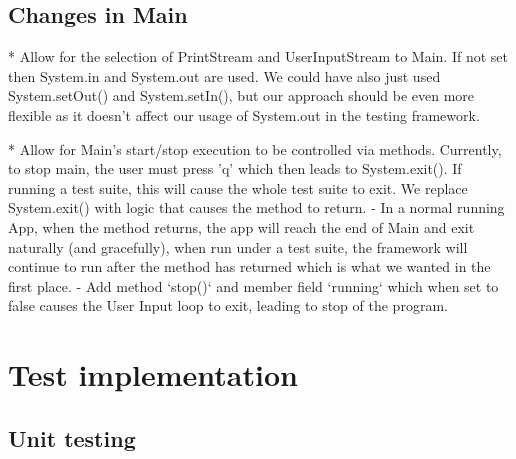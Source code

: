 \documentclass[11pt]{article}
\begin{document}
\subsection{Changes in Main}

* Allow for the selection of PrintStream and UserInputStream to Main. If not set then System.in and System.out are used. 
We could have also just used System.setOut() and System.setIn(), but our approach should be even more flexible as it doesn't affect our usage of System.out in the testing framework. 


* Allow for Main's start/stop execution to be controlled via methods. Currently, to stop main, the user must press 'q' which then leads to System.exit(). If running a test suite, this will cause the whole test suite to exit. We replace System.exit() with logic that causes the method to return. 
 -	In a normal running App,   when the method returns, the app will reach the end of Main and exit naturally (and gracefully), when run under a test suite, the framework will continue to run after the method has returned which is what we wanted in the first place. 
  - Add method `stop()` and member field `running` which when set to false causes the User Input loop to exit, leading to stop of the program.

\section{Test implementation}


\subsection{Unit testing}
\end{document}
